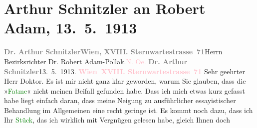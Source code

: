 

               \section[Arthur Schnitzler an Robert Adam, 13. 5. 1913]{ Arthur Schnitzler an Robert Adam, 13. 5. 1913}\nopagebreak{}\rehead{ }\normalsize\beginnumbering{} \toendnotes[C]{\smallbreak\pagebreak[2]} 
\toendnotes[C]{\smallbreak}\pstart{}{\pb}\textcolor{gray}{\textbf{Dr. Arthur Schnitzler}}\pend{}\pstart{}\textcolor{pink}{\textcolor{gray}{\textbf{Wien, XVIII. Sternwartestrasse 71}}}{}\ledrightnote{\textcolor{pink}{Sternwartestraße}}\pend{}{\bigskip}\pstart{}{\pb}Herrn Bezirksrichter \pend{}\pstart{}Dr. Robert Adam-Pollak\pend{}\pstart{}\textcolor{pink}{}{}\ledrightnote{\textcolor{pink}{Zistersdorf}}.\pend{}\pstart{}\textcolor{pink}{N. Oe.}{}\ledrightnote{\textcolor{pink}{Niederösterreich}}\pend{}{\bigskip}\pstart
           {\pb}\textcolor{gray}{\textbf{Dr. Arthur Schnitzler}}\hfill 13. 5. 1913.\pend
           \pstart
           \textcolor{gray}{\textbf{\textcolor{pink}{Wien XVIII. Sternwartestrasse 71}{}\ledrightnote{\textcolor{pink}{Sternwartestraße}}}}\pend
           \pstart\center{}Sehr geehrter Herr Doktor.\pend\pstart
           Es ist mir nicht ganz klar geworden, warum Sie glauben, dass die »\textcolor{green}{Fatme}{}\ledrightnote{\textcolor{green}{Fatme}}« nicht meinen Beifall gefunden habe.
                    Dass ich mich etwas kurz gefasst habe liegt einfach daran, dass meine Neigung zu
                    ausführlicher essayistischer Behandlung im Allgemeinen eine recht geringe ist.
                    Es kommt noch dazu, dass ich Ihr \textcolor{green}{Stück}{}, das ich wirklich mit Vergnügen gelesen habe, gleich Ihnen doch
